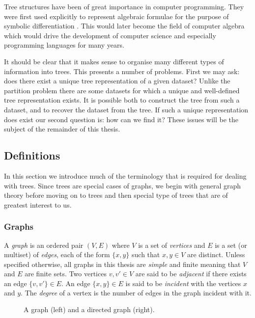 Tree structures have been of great importance in computer programming.  They
were first used explicitly to represent algebraic formulae for the purpose of
symbolic differentiation \citep{kahrimanian53differentiation}.  This would
later become the field of computer algebra which would drive the development
of computer science and especially programming languages for many years.

It should be clear that it makes sense to organise many different types of
information into trees.  This presents a number of problems.  First we may
ask: does there exist a unique tree representation of a given dataset?  Unlike
the partition problem there are some datasets for which a unique and
well-defined tree representation exists.  It is possible both to construct the
tree from such a dataset, and to recover the dataset from the tree.  If such a
unique representation does exist our second question is: how can we find it?
These issues will be the subject of the remainder of this thesis.

\subsection{Definitions}
\label{sec:definitions}

In this section we introduce much of the terminology that is required for
dealing with trees.  Since trees are special cases of graphs, we begin with
general graph theory before moving on to trees and then special type of trees
that are of greatest interest to us.

\subsubsection{Graphs}
\label{sec:graphs}

A \textit{graph} is an ordered pair $(V,E)$ where $V$ is a set of
\textit{vertices} and $E$ is a set (or multiset) of \textit{edges}, each of
the form $\{x,y\}$ such that $x,y \in V$ are distinct.  Unless specified
otherwise, all graphs in this thesis are \textit{simple} and finite meaning
that $V$ and $E$ are finite sets.  Two vertices $v,v' \in V$ are said to be
\textit{adjacent} if there exists an edge $\{v,v'\} \in E$.  An edge $\{x,y\}
\in E$ is said to be \textit{incident} with the vertices $x$ and $y$.  The
\textit{degree} of a vertex is the number of edges in the graph incident with
it.

\begin{figure}
  \centering
  
  \caption{A graph (left) and a directed graph (right).}
  \label{fig:graph-ex}
\end{figure}

